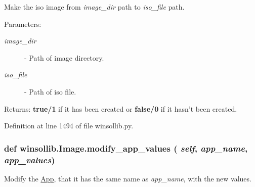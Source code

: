 Make the iso image from {\em image\_\-dir\/} path to {\em iso\_\-file\/} path. 

\begin{Desc}
\item[Parameters:]
\begin{description}
\item[{\em image\_\-dir}]- Path of image directory. \item[{\em iso\_\-file}]- Path of iso file. \end{description}
\end{Desc}
\begin{Desc}
\item[Returns:]{\bf true/1} if it has been created or {\bf false/0} if it hasn't been created. \end{Desc}


Definition at line 1494 of file winsollib.py.\hypertarget{classwinsollib_1_1Image_8f33bdfd475227d8d5e58738e2fe28c6}{
\subsubsection[modify\_\-app\_\-values]{\setlength{\rightskip}{0pt plus 5cm}def winsollib.Image.modify\_\-app\_\-values ( {\em self},  {\em app\_\-name},  {\em app\_\-values})}}
\label{classwinsollib_1_1Image_8f33bdfd475227d8d5e58738e2fe28c6}


Modify the \hyperlink{classwinsollib_1_1App}{App}, that it has the same name as {\em app\_\-name\/}, with the new values. 

